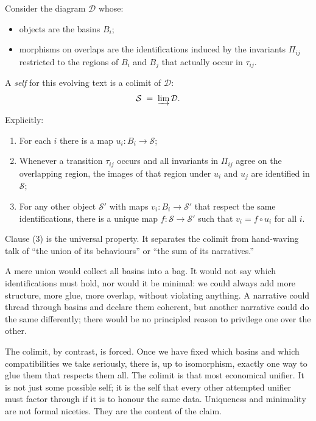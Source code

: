 \documentclass[12pt,a4paper]{article}
\begin{document}
\begin{formalbox}[title={Self as colimit over stance-glued basins}]
Consider the diagram $\mathcal{D}$ whose:
\begin{itemize}
  \item objects are the basins $B_i$;
  \item morphisms on overlaps are the identifications induced by the invariants $\Pi_{ij}$ restricted to the regions of $B_i$ and $B_j$ that actually occur in $\tau_{ij}$.
\end{itemize}
A \emph{self} for this evolving text is a colimit of $\mathcal{D}$:
\[
\mathcal{S} \;=\; \varinjlim \mathcal{D}.
\]

Explicitly:
\begin{enumerate}
  \item For each $i$ there is a map $u_i : B_i \to \mathcal{S}$;
  \item Whenever a transition $\tau_{ij}$ occurs and all invariants in $\Pi_{ij}$ agree on the overlapping region, the images of that region under $u_i$ and $u_j$ are identified in $\mathcal{S}$;
  \item For any other object $\mathcal{S}'$ with maps $v_i : B_i \to \mathcal{S}'$ that respect the same identifications, there is a unique map $f: \mathcal{S} \to \mathcal{S}'$ such that $v_i = f \circ u_i$ for all $i$.
\end{enumerate}
\end{formalbox}

Clause (3) is the universal property. It separates the colimit from hand-waving talk of ``the union of its behaviours'' or ``the sum of its narratives.''

A mere union would collect all basins into a bag. It would not say which identifications must hold, nor would it be minimal: we could always add more structure, more glue, more overlap, without violating anything. A narrative could thread through basins and declare them coherent, but another narrative could do the same differently; there would be no principled reason to privilege one over the other.

The colimit, by contrast, is forced. Once we have fixed which basins and which compatibilities we take seriously, there is, up to isomorphism, exactly one way to glue them that respects them all. The colimit is that most economical unifier. It is not just some possible self; it is the self that every other attempted unifier must factor through if it is to honour the same data. Uniqueness and minimality are not formal niceties. They are the content of the claim.
\end{document}
